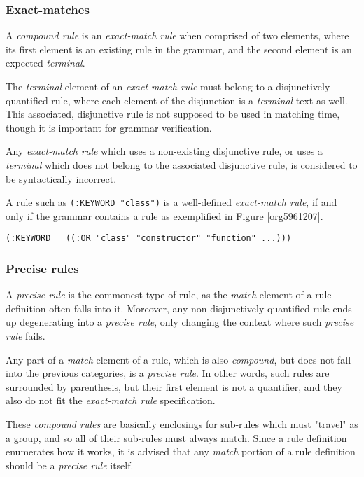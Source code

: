 \documentclass[a4paper,11pt,oneside]{article}
\begin{document}
\subsubsection*{Exact-matches}
\label{sec:org1aac2ea}

A \emph{compound rule} is an \emph{exact-match rule} when comprised of two elements,
where its first element is an existing rule in the grammar, and the
second element is an expected \emph{terminal}.

The \emph{terminal} element of an \emph{exact-match rule} must belong to a
disjunctively-quantified rule, where each element of the disjunction
is a \emph{terminal} text as well. This associated, disjunctive rule is not
supposed to be used in matching time, though it is important for
grammar verification.

Any \emph{exact-match rule} which uses a non-existing disjunctive rule, or
uses a \emph{terminal} which does not belong to the associated disjunctive
rule, is considered to be syntactically incorrect.

A rule such as \texttt{(:KEYWORD "class")} is a well-defined \emph{exact-match rule},
if and only if the grammar contains a rule as exemplified in Figure
\ref{org5961207}.

\begin{verbatim}
(:KEYWORD   ((:OR "class" "constructor" "function" ...)))
\end{verbatim}

\subsubsection*{Precise rules}
\label{sec:org273a64c}

A \emph{precise rule} is the commonest type of rule, as the \emph{match}
element of a rule definition often falls into it. Moreover, any
non-disjunctively quantified rule ends up degenerating into a \emph{precise
rule}, only changing the context where such \emph{precise rule} fails.

Any part of a \emph{match} element of a rule, which is also \emph{compound}, but
does not fall into the previous categories, is a \emph{precise rule}. In
other words, such rules are surrounded by parenthesis, but their first
element is not a quantifier, and they also do not fit the \emph{exact-match
rule} specification.

These \emph{compound rules} are basically enclosings for sub-rules which must
"travel" as a group, and so all of their sub-rules must always
match. Since a rule definition enumerates how it works, it is advised
that any \emph{match} portion of a rule definition should be a \emph{precise rule}
itself.
\end{document}
